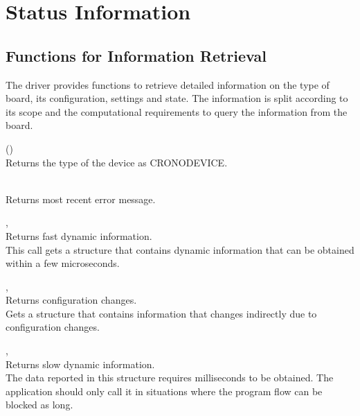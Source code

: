 \section{Status Information}
	

\subsection{Functions for Information Retrieval}
    The driver provides functions to retrieve detailed information on the type of board, its configuration, settings and state. 
    The information is split according to its scope and the computational requirements to query the information from the board.
    

    (\device)\\
    Returns the type of the device as \textsf{CRONO\tu DEVICE\tu {}}.\par

    \\
    Returns most recent error message.\par

    \deviceindex, \lb{}\\
    Returns fast dynamic information.\\
    This call gets a structure that contains dynamic information that can be obtained within a few microseconds.\par

    \deviceindex, \lb{}\\
    Returns configuration changes.\\
    Gets a structure that contains information that changes indirectly due to configuration changes.\par

    \deviceindex, \lb{}\\
    Returns slow dynamic information.\\
    The data reported in this structure requires milliseconds to be obtained. 
    The application should only call it in situations where the program flow can be blocked as long.\par

